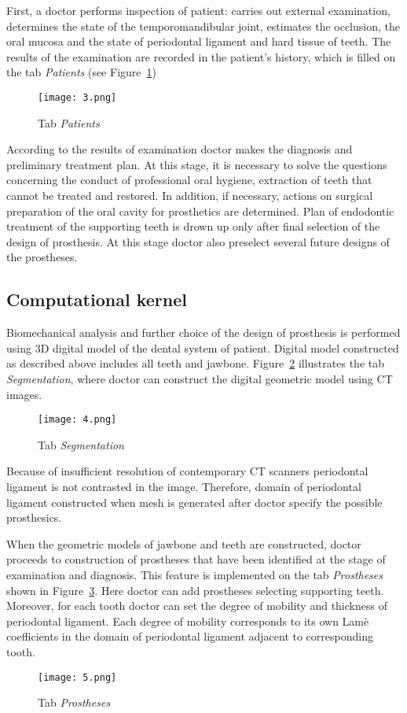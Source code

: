 \documentclass{elsarticle}
\begin{document}
First, a doctor performs inspection of patient: carries out external
examination, determines the state of the temporomandibular joint,
estimates the occlusion, the oral mucosa and the state of periodontal ligament
and hard tissue of teeth. The results of the examination are recorded
in the patient's history, which is filled on the tab  \emph{Patients}
(see Figure~\ref{fig:3})
\begin{figure}[h]
  \centering
  \texttt{[image: 3.png]}
  \caption{Tab  \emph{Patients}}
  \label{fig:3}
\end{figure}

According to the results of examination doctor makes the diagnosis and
preliminary treatment plan. At this stage, it is necessary to solve
the questions concerning the conduct of professional oral hygiene,
extraction of teeth that cannot be treated and restored. In addition,
if necessary, actions on surgical preparation of the oral cavity for
prosthetics are determined. Plan of endodontic treatment of the
supporting teeth is drown up only after final selection of the design of
prosthesis. At this stage doctor also preselect several future designs
of the prostheses.

\subsection{Computational kernel} 

Biomechanical analysis and further choice of the design of prosthesis
is performed using 3D digital model of the dental system of
patient. Digital model constructed as described above includes all
teeth and jawbone. Figure~\ref{fig:4} illustrates the tab
\emph{Segmentation}, where doctor can construct the digital geometric
model using CT images.
\begin{figure}[h]
  \centering
  \texttt{[image: 4.png]}
  \caption{Tab \emph{Segmentation}}
  \label{fig:4}
\end{figure}

Because of insufficient resolution of contemporary CT scanners
periodontal ligament is not contrasted in the image. Therefore, domain of
periodontal ligament constructed when mesh is generated after doctor specify
the possible prosthesics.

When the geometric models of jawbone and teeth are constructed, doctor
proceeds to construction of prostheses that have been identified at
the stage of examination and diagnosis. This feature is implemented on
the tab \emph{Prostheses} shown in Figure~\ref{fig:5}. Here doctor can add
prostheses selecting supporting teeth. Moreover, for each tooth doctor can
set the degree of mobility and thickness of periodontal ligament. Each degree
of mobility corresponds to its own Lam\`e coefficients in the domain
of periodontal ligament adjacent to corresponding tooth.
\begin{figure}[h]
  \centering
  \texttt{[image: 5.png]}
  \caption{Tab \emph{Prostheses}}
  \label{fig:5}
\end{figure}
\end{document}
